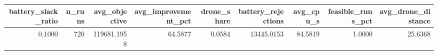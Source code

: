 \begin{tabular}{rrrrrrrrr}
\toprule
battery_slack_ratio & n_runs & avg_objective & avg_improvement_pct & drone_share & battery_rejections & avg_cpu_s & feasible_runs_pct & avg_drone_distance \\
\midrule
0.1000 & 720 & 119681.1958 & 64.5877 & 0.0584 & 13445.0153 & 84.5819 & 1.0000 & 25.6368 \\
\bottomrule
\end{tabular}
